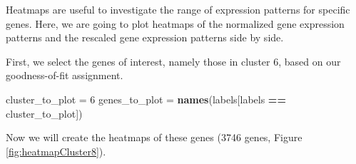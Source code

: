 \documentclass[9pt,a4paper,]{extarticle}
\newenvironment{Shaded}{\begin{snugshade}}{\end{snugshade}}
\newcommand{\DecValTok}[1]{\textcolor[rgb]{0.00,0.00,0.81}{#1}}
\newcommand{\KeywordTok}[1]{\textcolor[rgb]{0.13,0.29,0.53}{\textbf{#1}}}
\newcommand{\NormalTok}[1]{#1}
\newcommand{\OperatorTok}[1]{\textcolor[rgb]{0.81,0.36,0.00}{\textbf{#1}}}
\newcommand{\StringTok}[1]{\textcolor[rgb]{0.31,0.60,0.02}{#1}}
\begin{document}
Heatmaps are useful to investigate the range of expression patterns for
specific genes. Here, we are going to plot heatmaps of the normalized gene
expression patterns and the rescaled gene expression patterns side by side.

First, we select the genes of interest, namely those in cluster 6, based on
our goodness-of-fit assignment.

\begin{Shaded}
\begin{Highlighting}[]
\NormalTok{cluster_to_plot =}\StringTok{ }\DecValTok{6}
\NormalTok{genes_to_plot =}\StringTok{  }\KeywordTok{names}\NormalTok{(labels[labels }\OperatorTok{==}\StringTok{ }\NormalTok{cluster_to_plot])}
\end{Highlighting}
\end{Shaded}

Now we will create the heatmaps of these genes (3746 genes, Figure \ref{fig:heatmapCluster8}).
\end{document}

